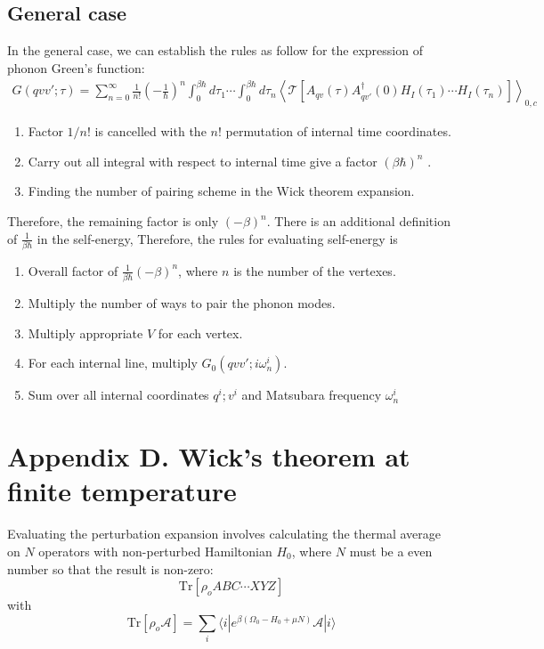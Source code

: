\documentclass{article}
\begin{document}
\subsection*{General case}
In the general case, we can establish the rules as follow for the expression of phonon Green's function:
\begin{align}
    G(qvv';\tau)= \sum_{n=0}^{\infty} \frac{1}{n!} \left( -\frac{1}{\hbar} \right)^{n} 
    \int_0^{\beta\hbar} d\tau_1 \cdots \int_0^{\beta\hbar} d\tau_{n} \left\langle \mathcal{T}[ A_{qv}(\tau) A_{qv'}^{\dagger}(0) H_I(\tau_1) \cdots H_I(\tau_{n}) ] \right\rangle_{0,c} 
\end{align}
\begin{enumerate}
    \item Factor $1/n!$ is cancelled with the $n!$ permutation of internal time coordinates.
    \item Carry out all integral with respect to internal time give a factor $(\beta\hbar)^n$ .
    \item Finding the number of pairing scheme in the Wick theorem expansion.
\end{enumerate}
Therefore, the remaining factor is only $(-\beta)^n$. There is an additional definition of 
$\frac{1}{\beta\hbar}$ in the self-energy, Therefore, the rules for evaluating self-energy 
is 
\begin{enumerate}
    \item Overall factor of $\frac{1}{\beta\hbar} (-\beta)^n$, where $n$ is the number of the vertexes.
    \item Multiply the number of ways to pair the phonon modes.
    \item Multiply appropriate $V$ for each vertex.
    \item For each internal line, multiply $G_0(qvv';i\omega^i_n)$.
    \item Sum over all internal coordinates $q^i;v^i$ and Matsubara frequency $\omega_n^i$
\end{enumerate}

\pagebreak
\section*{Appendix D. Wick's theorem at finite temperature}
Evaluating the perturbation expansion involves calculating the thermal average on $N$ operators with  
non-perturbed Hamiltonian $H_0$, where
$N$ must be a even number so that the result is non-zero:
\begin{equation}
    \text{Tr}\left[ \rho_o ABC \cdots XYZ  \right]
\end{equation}
with 
\begin{equation}
    \text{Tr}\left[ \rho_o \mathcal{A} \right] = \sum_i \langle i | e^{\beta(\Omega_0 - H_0 + \mu N)} \mathcal{A} |i \rangle
\end{equation}
\end{document}
